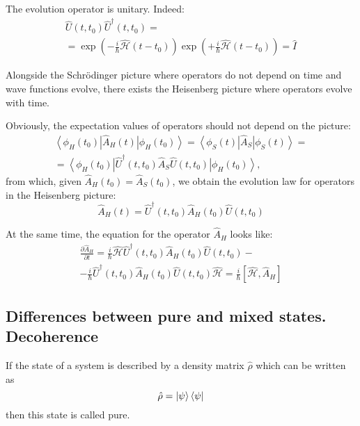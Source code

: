 The evolution operator is unitary. Indeed:
\begin{eqnarray}
\hat{U}\left(t,t_0\right)\hat{U}^\dag\left(t,t_0\right) = 
\nonumber \\
= \exp\left( -\frac{i}{\hbar} \hat{\mathcal{H}} \left( t - t_0 \right)
\right)
\exp\left( +\frac{i}{\hbar} \hat{\mathcal{H}} \left( t - t_0 \right)
\right)
= \hat{I}
\nonumber
\end{eqnarray}

Alongside the Schrödinger picture where operators do not depend on time
and wave functions evolve, there exists the Heisenberg picture where
operators evolve with time.

Obviously, the expectation values of operators should not depend on
the picture:
\begin{eqnarray}
\left< \phi_H\left(t_0\right) \right|\hat{A}_H\left(t\right)\left| 
\phi_H\left(t_0\right) \right> = 
\left< \phi_S\left(t\right) \right|\hat{A}_S\left| 
\phi_S\left(t\right) \right> = 
\nonumber \\
=
\left<
\phi_H\left(t_0\right)\right|\hat{U}^\dag\left(t,t_0\right)\hat{A}_S\hat{U}\left(t,t_0\right)\left|
\phi_H\left(t_0\right) \right>,
\nonumber
\end{eqnarray}
from which, given $\hat{A}_H\left(t_0\right) = \hat{A}_S\left(t_0\right)$, we obtain the evolution law for operators in the Heisenberg picture:
\begin{equation}
\hat{A}_H\left(t\right) = \hat{U}^\dag\left(t,t_0\right)\hat{A}_H\left(t_0\right)\hat{U}\left(t,t_0\right)
\label{eqAddWaveFunc_HeizenbergU}
\end{equation}

At the same time, the equation for the operator $\hat{A}_H$ looks like:
\begin{eqnarray}
  \frac{\partial \hat{A}_H}{\partial t} =
  \frac{i}{\hbar} \hat{\mathcal{H}}
  \hat{U}^\dag\left(t,t_0\right)\hat{A}_H\left(t_0\right)\hat{U}\left(t,t_0\right)
  -
  \nonumber \\
  - \frac{i}{\hbar}
  \hat{U}^\dag\left(t,t_0\right)\hat{A}_H\left(t_0\right)\hat{U}\left(t,t_0\right)
  \hat{\mathcal{H}} =
  \frac{i}{\hbar} \left[\hat{\mathcal{H}}, \hat{A}_H \right]
  \label{eqAddWaveFunc_HeizenbergT}
\end{eqnarray}

\subsection{Differences between pure and mixed states. Decoherence}
\begin{definition}
If the state of a system is described by a density matrix $\hat{\rho}$
which can be written as 
\begin{equation}
\hat{\rho} = \ket{\psi}\bra{\psi}
\label{eq:add:quant:purestate}
\end{equation}
then this state is called pure.
\end{definition}

